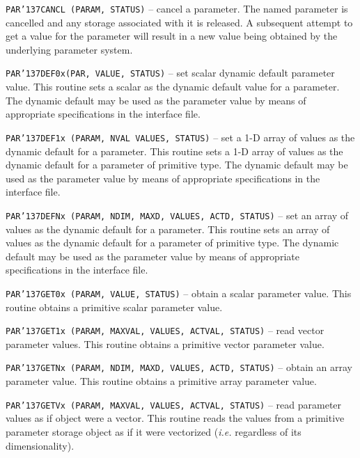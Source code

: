 \documentclass[twoside,11pt]{article}
\renewcommand{\_}{{\tt\char'137}}
\begin{document}
\begin{description}

\item{\tt PAR\_CANCL (PARAM, STATUS)}
 -- cancel a parameter.
The named parameter is cancelled and any storage associated
with it is released. A subsequent attempt to get a value for the
parameter will result in a new value being obtained by the
underlying parameter system.

\item{\tt PAR\_DEF0x(PAR, VALUE, STATUS)}
-- set scalar dynamic default parameter value.
This routine sets a scalar as the dynamic default value for a
parameter. The dynamic default may be used as the parameter
value by means of appropriate specifications in the interface file.

\item{\tt PAR\_DEF1x (PARAM, NVAL VALUES, STATUS)}
-- set a 1-D array of values as the dynamic default for a parameter.
This routine sets a 1-D array of values as the dynamic default for
a parameter of primitive type. The dynamic default may be used as
the parameter value by  means of appropriate specifications in the interface
file.


\item{\tt PAR\_DEFNx (PARAM, NDIM, MAXD, VALUES, ACTD, STATUS)}
-- set an array of values as the dynamic default for a parameter.
This routine sets an array of values as the dynamic default for
a parameter of primitive type. The dynamic default may be used
as the parameter value by  means of appropriate specifications in the
interface file.


\item{\tt PAR\_GET0x (PARAM, VALUE, STATUS)}
-- obtain a scalar parameter value.
This routine obtains a primitive scalar parameter value.


\item{\tt PAR\_GET1x (PARAM, MAXVAL, VALUES, ACTVAL, STATUS)}
-- read vector parameter values.
This routine obtains a primitive vector parameter value.


\item{\tt PAR\_GETNx (PARAM, NDIM, MAXD, VALUES, ACTD, STATUS)}
-- obtain an array parameter value.
This routine obtains a primitive array parameter value.



\item{\tt PAR\_GETVx (PARAM, MAXVAL, VALUES, ACTVAL, STATUS)}
-- read parameter values as if object were a vector.
This routine reads the values from a primitive parameter storage
object as if it were vectorized ({\it i.e.} regardless of its dimensionality).


\end{description}
\end{document}
